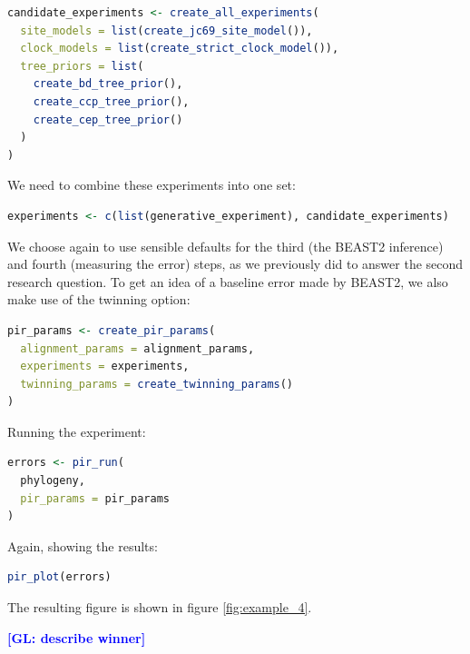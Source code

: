 \documentclass{article}
\newcommand{\giovanni}[1]{\textcolor{blue}{\textbf{[GL: #1]}}}
\begin{document}
\begin{lstlisting}[language=R, floatplacement=H, frame=single]
candidate_experiments <- create_all_experiments(
  site_models = list(create_jc69_site_model()),
  clock_models = list(create_strict_clock_model()),
  tree_priors = list(
    create_bd_tree_prior(), 
    create_ccp_tree_prior(), 
    create_cep_tree_prior()
  )
)
\end{lstlisting}

We need to combine these experiments into one set:

\begin{lstlisting}[language=R, floatplacement=H, frame=single]
experiments <- c(list(generative_experiment), candidate_experiments)
\end{lstlisting}

We choose again to use sensible defaults for the third (the BEAST2 inference) and fourth (measuring the error) steps, as we previously did to answer the second research question. To get an idea of a baseline error made by BEAST2, we also make use of the twinning option:

\begin{lstlisting}[language=R, floatplacement=H, frame=single]
pir_params <- create_pir_params(
  alignment_params = alignment_params,
  experiments = experiments,
  twinning_params = create_twinning_params()
)
\end{lstlisting}

Running the experiment:

\begin{lstlisting}[language=R, floatplacement=H, frame=single]
errors <- pir_run(
  phylogeny,
  pir_params = pir_params
)
\end{lstlisting}

Again, showing the results:

\begin{lstlisting}[language=R, floatplacement=H, frame=single]
pir_plot(errors)
\end{lstlisting}

The resulting figure is shown in figure \ref{fig:example_4}.

\giovanni{describe winner}
\end{document}
